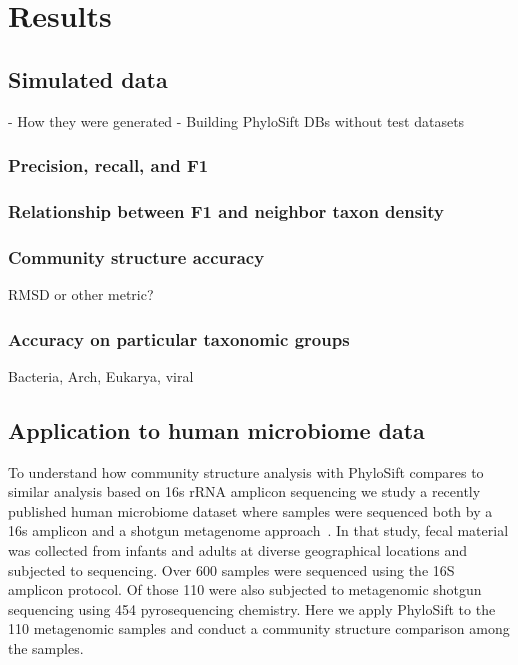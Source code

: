 \documentclass[10pt]{article}
\begin{document}
\section*{Results}



\subsection*{Simulated data}
    - How they were generated
    - Building PhyloSift DBs without test datasets
\subsubsection*{Precision, recall, and F1}
\subsubsection*{Relationship between F1 and neighbor taxon density}

\subsubsection*{Community structure accuracy}
RMSD or other metric?

\subsubsection*{Accuracy on particular taxonomic groups}
Bacteria, Arch, Eukarya, viral

\subsection*{Application to human microbiome data}

To understand how community structure analysis with PhyloSift compares to similar analysis based on 16s rRNA amplicon sequencing we study a recently published human microbiome dataset where samples were sequenced both by a 16s amplicon and a shotgun metagenome approach~\cite{Yugocrazy2012}.
In that study, fecal material was collected from infants and adults at diverse geographical locations and subjected to sequencing.
Over 600 samples were sequenced using the 16S amplicon protocol.
Of those 110 were also subjected to metagenomic shotgun sequencing using 454 pyrosequencing chemistry.
Here we apply PhyloSift to the 110 metagenomic samples and conduct a community structure comparison among the samples.
\end{document}
